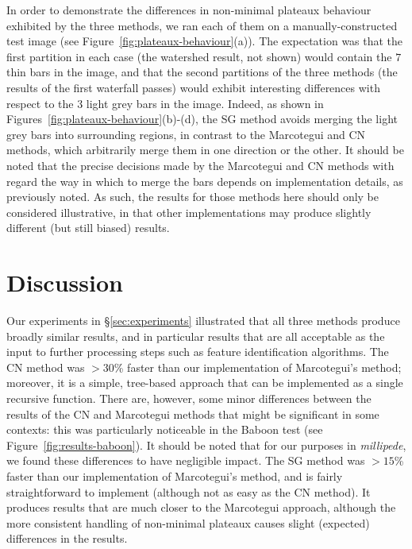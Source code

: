 \documentclass[preprint,a4paper]{elsarticle}
\begin{document}
In order to demonstrate the differences in non-minimal plateaux behaviour exhibited by the three methods, we ran each of them on a manually-constructed test image (see Figure~\ref{fig:plateaux-behaviour}(a)). The expectation was that the first partition in each case (the watershed result, not shown) would contain the $7$ thin bars in the image, and that the second partitions of the three methods (the results of the first waterfall passes) would exhibit interesting differences with respect to the $3$ light grey bars in the image. Indeed, as shown in Figures~\ref{fig:plateaux-behaviour}(b)-(d), the SG method avoids merging the light grey bars into surrounding regions, in contrast to the Marcotegui and CN methods, which arbitrarily merge them in one direction or the other. It should be noted that the precise decisions made by the Marcotegui and CN methods with regard the way in which to merge the bars depends on implementation details, as previously noted. As such, the results for those methods here should only be considered illustrative, in that other implementations may produce slightly different (but still biased) results.

\section{Discussion}
\label{sec:discussion}

Our experiments in \S\ref{sec:experiments} illustrated that all three methods produce broadly similar results, and in particular results that are all acceptable as the input to further processing steps such as feature identification algorithms. The CN method was $> 30$\% faster than our implementation of Marcotegui's method; moreover, it is a simple, tree-based approach that can be implemented as a single recursive function. There are, however, some minor differences between the results of the CN and Marcotegui methods that might be significant in some contexts: this was particularly noticeable in the Baboon test (see Figure~\ref{fig:results-baboon}). It should be noted that for our purposes in \emph{millipede}, we found these differences to have negligible impact. The SG method was $> 15$\% faster than our implementation of Marcotegui's method, and is fairly straightforward to implement (although not as easy as the CN method). It produces results that are much closer to the Marcotegui approach, although the more consistent handling of non-minimal plateaux causes slight (expected) differences in the results.
\end{document}
